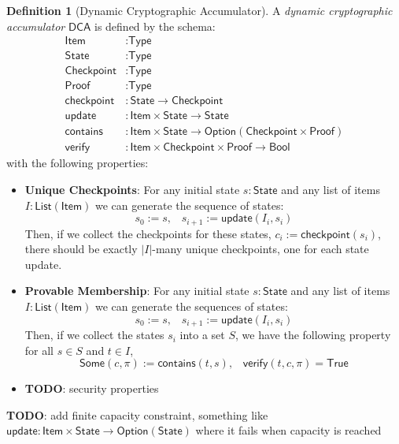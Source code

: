 \documentclass[a4paper]{article}
\newcommand{\TODO}[1]{{\color{red}\textbf{TODO}}: #1}
\theoremstyle{definition}
\newtheorem{definition}{Definition}[subsection]
\renewcommand{\abs}[1]{\left|#1\right|}
\newcommand{\Bool}{{\textsf{Bool}}}
\newcommand{\Checkpoint}{{\textsf{Checkpoint}}}
\newcommand{\DCA}{{\textsf{DCA}}}
\newcommand{\Item}{{\textsf{Item}}}
\newcommand{\List}{{\textsf{List}}}
\newcommand{\Option}{{\textsf{Option}}}
\newcommand{\Proof}{{\textsf{Proof}}}
\newcommand{\Some}{{\textsf{Some}}}
\newcommand{\StateT}{{\textsf{State}}}
\newcommand{\True}{{\textsf{True}}}
\newcommand{\Type}{{\textsf{Type}}}
\newcommand{\checkpoint}{{\textsf{checkpoint}}}
\newcommand{\contains}{{\textsf{contains}}}
\newcommand{\update}{{\textsf{update}}}
\newcommand{\verify}{{\textsf{verify}}}
\begin{document}
\begin{definition}[Dynamic Cryptographic Accumulator]
    A \emph{dynamic cryptographic accumulator} $\DCA$ is defined by the schema:
    \begin{align*}
        \Item       &: \Type \\
        \StateT     &: \Type \\
        \Checkpoint &: \Type \\
        \Proof      &: \Type \\
        \checkpoint &: \StateT \to \Checkpoint \\
        \update     &: \Item \times \StateT \to \StateT \\
        \contains   &: \Item \times \StateT \to \Option(\Checkpoint \times \Proof) \\
        \verify     &: \Item \times \Checkpoint \times \Proof \to \Bool
    \end{align*}
    with the following properties:
    \begin{itemize}
        \item \textbf{Unique Checkpoints}: For any initial state $s : \StateT$ and any list of items $I : \List(\Item)$ we can generate the sequence of states:
            \[s_0 := s, \,\,\,\,\, s_{i + 1} := \update(I_i, s_i)\]
            Then, if we collect the checkpoints for these states, $c_i := \checkpoint(s_i)$, there should be exactly $\abs{I}$-many unique checkpoints, one for each state update.
        \item \textbf{Provable Membership}: For any initial state $s : \StateT$ and any list of items $I : \List(\Item)$ we can generate the sequences of states:
            \[s_0 := s, \,\,\,\,\, s_{i + 1} := \update(I_i, s_i)\]
            Then, if we collect the states $s_i$ into a set $S$, we have the following property for all $s \in S$ and $t \in I$,
            \[\Some(c, \pi) := \contains(t, s), \,\,\,\,\, \verify(t, c, \pi) = \True\]
        \item \TODO{security properties}
    \end{itemize}
    \TODO{add finite capacity constraint, something like $\update : \Item \times \StateT \to \Option(\StateT)$ where it fails when capacity is reached}
\end{definition}
\end{document}

